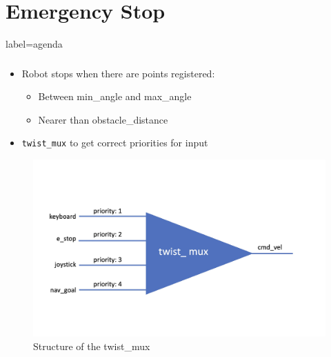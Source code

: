 \documentclass[numberofslides]{AMSBeamer}
\begin{document}
\section{Emergency Stop}
\begin{frame}{label=agenda}
    \frametitle{\insertsectionhead}
    \begin{minipage}{0.4\textwidth}
        \begin{itemize}
            \item Robot stops when there are points registered:
            \begin{itemize}
                \item Between min\_angle and max\_angle
                \item Nearer than obstacle\_distance
            \end{itemize}
            \item \texttt{twist\_mux} to get correct priorities for input
        \end{itemize}
    \end{minipage}%
    \begin{minipage}{0.6\textwidth}
        \begin{figure}
            \centering
            \includegraphics[width=\textwidth]{Presentations/LaTeX/images/twist_mux.jpeg}
            \caption{Structure of the twist\_mux}
            \label{fig:enter-label}
        \end{figure}
    \end{minipage}
\end{frame}
\end{document}
